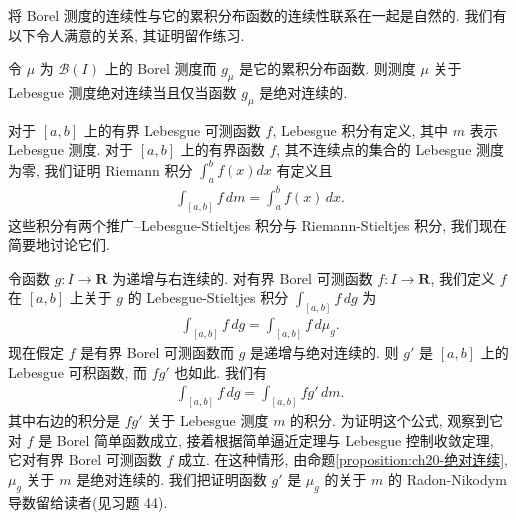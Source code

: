 \documentclass[../../main.tex]{subfiles}
\begin{document}
将 Borel 测度的连续性与它的累积分布函数的连续性联系在一起是自然的. 我们有以下令人满意的关系, 其证明留作练习.

\begin{proposition}\label{proposition:ch20-绝对连续}
令 $\mu$ 为 $\mathcal{B}(I)$ 上的 Borel 测度而 $g_{\mu}$ 是它的累积分布函数. 则测度 $\mu$ 关于 Lebesgue 测度绝对连续当且仅当函数 $g_{\mu}$ 是绝对连续的.
\end{proposition}

对于 $[a,b]$ 上的有界 Lebesgue 可测函数 $f$, Lebesgue 积分有定义, 其中 $m$ 表示 Lebesgue 测度. 对于 $[a,b]$ 上的有界函数 $f$, 其不连续点的集合的 Lebesgue 测度为零, 我们证明 Riemann 积分 $\int_{a}^{b}f(x)dx$ 有定义且
\begin{align*}
\int_{[a,b]}f\,dm=\int_{a}^{b}f(x)\,dx.
\end{align*}
这些积分有两个推广--Lebesgue-Stieltjes 积分与 Riemann-Stieltjes 积分, 我们现在简要地讨论它们.

令函数 $g:I\to\mathbf{R}$ 为递增与右连续的. 对有界 Borel 可测函数 $f:I\to\mathbf{R}$, 我们定义 $f$ 在 $[a,b]$ 上关于 $g$ 的 Lebesgue-Stieltjes 积分 $\int_{[a,b]}f\,dg$ 为
\begin{align}\label{align:ch20-lebesgue-stieltjes}
\int_{[a,b]}f\,dg=\int_{[a,b]}f\,d\mu_{g}.
\end{align}
现在假定 $f$ 是有界 Borel 可测函数而 $g$ 是递增与绝对连续的. 则 $g'$ 是 $[a,b]$ 上的 Lebesgue 可积函数, 而 $fg'$ 也如此. 我们有
\begin{align}\label{align:ch20-绝对连续stieltjes}
\int_{[a,b]}f\,dg=\int_{[a,b]}fg'\,dm.
\end{align}
其中右边的积分是 $fg'$ 关于 Lebesgue 测度 $m$ 的积分. 为证明这个公式, 观察到它对 $f$ 是 Borel 简单函数成立, 接着根据简单逼近定理与 Lebesgue 控制收敛定理, 它对有界 Borel 可测函数 $f$ 成立. 在这种情形, 由命题\cref{proposition:ch20-绝对连续}, $\mu_{g}$ 关于 $m$ 是绝对连续的. 我们把证明函数 $g'$ 是 $\mu_{g}$ 的关于 $m$ 的 Radon-Nikodym 导数留给读者(见习题 44).
\end{document}
